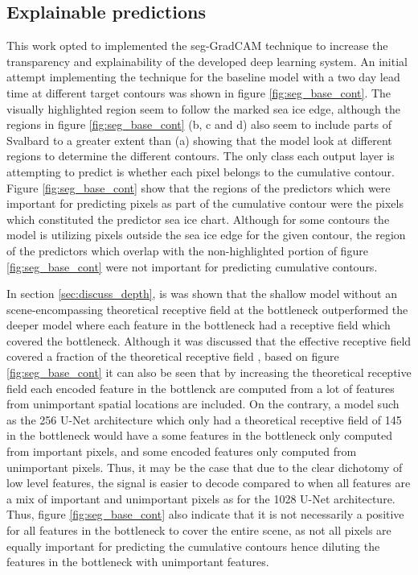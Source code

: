 \documentclass[../main/thesis]{subfiles}
\begin{document}
\subsection{Explainable predictions}
\label{sec:discuss_seggradcam}
This work opted to implemented the seg-GradCAM technique \citep{Vinogradova2020} to increase the transparency and explainability of the developed deep learning system. An initial attempt implementing the technique for the baseline model with a two day lead time at different target contours was shown in figure \ref{fig:seg_base_cont}. The visually highlighted region seem to follow the marked sea ice edge, although the regions in figure \ref{fig:seg_base_cont} (b, c and d) also seem to include parts of Svalbard to a greater extent than (a) showing that the model look at different regions to determine the different contours. The only class each output layer is attempting to predict is whether each pixel belongs to the cumulative contour. Figure \ref{fig:seg_base_cont} show that the regions of the predictors which were important for predicting pixels as part of the cumulative contour were the pixels which constituted the predictor sea ice chart. Although for some contours the model is utilizing pixels outside the sea ice edge for the given contour, the region of the predictors which overlap with the non-highlighted portion of figure \ref{fig:seg_base_cont} were not important for predicting cumulative contours. 

In section \ref{sec:discuss_depth}, is was shown that the shallow model without an scene-encompassing theoretical receptive field at the bottleneck outperformed the deeper model where each feature in the bottleneck had a receptive field which covered the bottleneck. Although it was discussed that the effective receptive field covered a fraction of the theoretical receptive field \citep{Luo2017}, based on figure \ref{fig:seg_base_cont} it can also be seen that by increasing the theoretical receptive field each encoded feature in the bottlenck are computed from a lot of features from unimportant spatial locations are included. On the contrary, a model such as the 256 U-Net architecture which only had a theoretical receptive field of 145 in the bottleneck would have a some features in the bottleneck only computed from important pixels, and some encoded features only computed from unimportant pixels. Thus, it may be the case that due to the clear dichotomy of low level features, the signal is easier to decode compared to when all features are a mix of important and unimportant pixels as for the 1028 U-Net architecture. Thus, figure \ref{fig:seg_base_cont} also indicate that it is not necessarily a positive for all features in the bottleneck to cover the entire scene, as not all pixels are equally important for predicting the cumulative contours hence diluting the features in the bottleneck with unimportant features.
\end{document}
